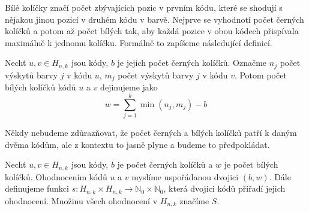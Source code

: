 
Bílé kolíčky značí počet zbývajících pozic v prvním kódu, které se shodují s nějakou jinou pozicí v druhém kódu v barvě. Nejprve se vyhodnotí počet černých kolíčků a potom až počet bílých tak, aby každá pozice v obou kódech přispívala maximálně k jednomu kolíčku. Formálně to zapíšeme následující definicí. 

\begin{definice}\label{defbilekol}
  Nechť $u,v \in H_{n,k}$ jsou kódy, $b$ je jejich počet černých kolíčků. 
  Označme $n_j$ počet výskytů barvy $j$ v kódu $u$, $m_j$ počet výskytů barvy $j$ v kódu $v$. 
  Potom počet bílých kolíčků kódů $u$ a $v$ dejinujeme jako 
  \[w = \sum_{j = 1}^k  \min(n_j, m_j) - b\]
\end{definice}

Někdy nebudeme zdůrazňovat, že počet černých a bílých kolíčků patří k daným dvěma kódům, ale z kontextu to jasně plyne a budeme to předpokládat. 

\begin{definice}[Ohodnocení]\label{ohodnoceni}
  Nechť $u,v \in H_{n,k}$ jsou kódy, $b$ je počet černých kolíčků a $w$ je počet bílých kolíčků. 
  Ohodnocením kódů $u$ a $v$ myslíme uspořádanou dvojici $(b,w)$.
  Dále definujeme funkci $s \colon H_{n,k} \times H_{n,k} \to \mathbb{N}_0\times \mathbb{N}_0$, která dvojici kódů přiřadí jejich ohodnocení. Množinu všech ohodnocení v $H_{n,k}$ značíme $S$.
\end{definice}

